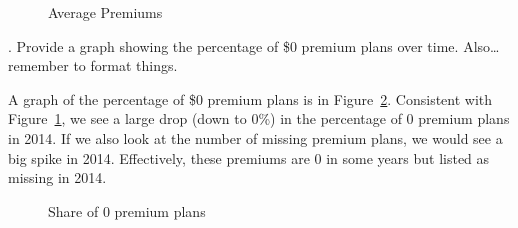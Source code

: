 \documentclass[
  letterpaper,
  DIV=11,
  numbers=noendperiod]{scrartcl}
\begin{document}
\begin{figure}


\caption{\label{fig-premium}Average Premiums}

\end{figure}%

\newpage

. Provide a graph showing the percentage of \$0 premium plans
over time. Also\ldots remember to format things.

A graph of the percentage of \$0 premium plans is in
Figure~\ref{fig-zero}. Consistent with Figure~\ref{fig-premium}, we see
a large drop (down to 0\%) in the percentage of 0 premium plans in 2014.
If we also look at the number of missing premium plans, we would see a
big spike in 2014. Effectively, these premiums are 0 in some years but
listed as missing in 2014.

\begin{figure}


\caption{\label{fig-zero}Share of 0 premium plans}

\end{figure}%
\end{document}
